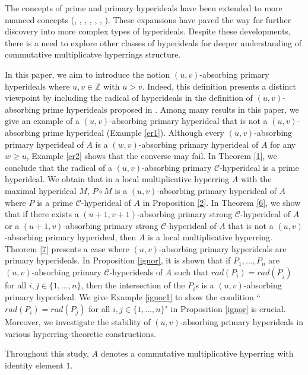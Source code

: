 \documentclass[preprint,review,10pt]{amsart}
\theoremstyle{definition}
\theoremstyle{remark}
\numberwithin{equation}{section}
\begin{document}
The concepts of prime and primary hyperideals have been extended to more nuanced concepts (\cite{Ay}, \cite{far}, \cite{Ghiasvand}, \cite{Ghiasvand2}, \cite{Mena}, \cite{Sen}, \cite{ul}). These expansions have paved the way for further discovery into more complex types of hyperideals. Despite these developments, there is a need to explore other classes of hyperideals for deeper understanding of commutative multiplicatve hyperrings structure.

In this paper, we aim to introduce the notion $(u,v)$-absorbing primary hyperideals  where $u,v \in \mathbb{Z}$ with $u>v$. Indeed,  this definition presents a distinct viewpoint by including the radical of  hyperideals   in the definition of  $(u,v)$-absorbing prime hyperideals proposed in \cite{anb8}.
 Among many results in this paper, we give an example of a $(u,v)$-absorbing primary hyperideal that is not a $(u,v)$-absorbing prime hyperideal (Example \ref{er1}). Although every $(u,v)$-absorbing primary  hyperideal of $A$ is a $(w,v)$-absorbing primary hyperideal of $A$ for any $w \geq u$, Example \ref{er2} shows that the converse may fail. In Theorem \ref{1}, we conclude that the radical of a $(u,v)$-absorbing primary $\mathcal{C}$-hyperideal is a prime  hyperideal. We obtain that in a local multiplicative hyperring $A$ with the maximal hyperideal $M$, $P \circ M$ is a $(u,v)$-absorbing primary hyperideal of $A$  where $P$ is a prime $\mathcal{C}$-hyperideal of $A$ in Proposition \ref{2}. In Theorem \ref{6}, we show that if there exists a $(u+1,v+1)$-absorbing primary strong $\mathcal{C}$-hyperideal of $A$ or a $(u+1,v)$-absorbing primary strong $\mathcal{C}$-hyperideal of $A$ that is not a $(u,v)$-absorbing primary hyperideal, then $A$ is a local multiplicative hyperring. Theorem \ref{7} presents a case where $(u,v)$-absorbing primary hyperideals are primary hyperideals. In Proposition \ref{ignor}, it is shown that if $P_1,\ldots,P_n$ are $(u,v)$-absorbing primary $\mathcal{C}$-hyperideals of $A$ such that $rad(P_i)=rad(P_j)$ for all $i,j \in \{1,\ldots,n\}$, then the intersection of the $P_i^,$s is a $(u,v)$-absorbing primary hyperideal. We give Example \ref{ignor1}  to show the condition  ``$rad(P_i)=rad(P_j)$ for all $i,j \in \{1,\ldots,n\}$" in Proposition \ref{ignor} is crucial. Moreover, we investigate the stability of $(u,v)$-absorbing primary hyperideals in various hyperring-theoretic constructions. 

Throughout this study, $A$  denotes a commutative multiplicative hyperring with identity element $1$.
\end{document}
